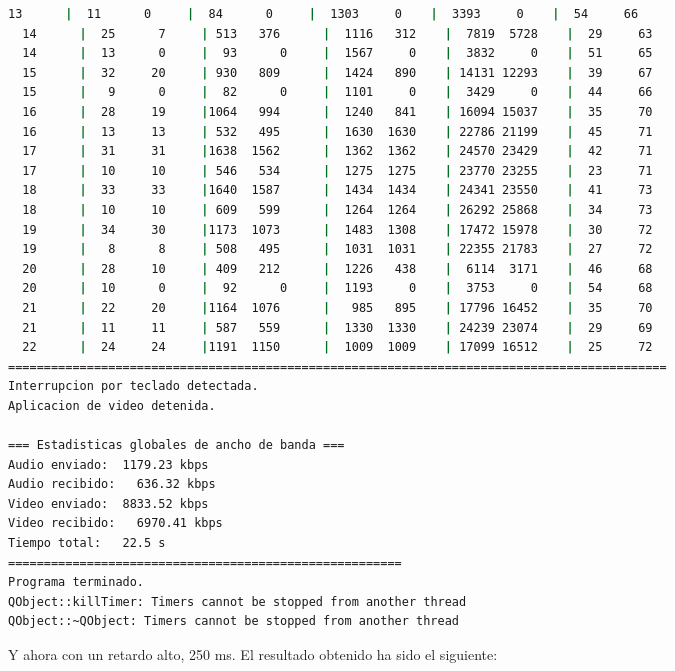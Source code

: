 \begin{adjustbox}{max width=\textwidth}
\begin{lstlisting}[language=bash,basicstyle=\ttfamily\scriptsize]
  13      |  11      0     |  84      0     |  1303     0    |  3393     0    |  54     66
  14      |  25      7     | 513   376      |  1116   312    |  7819  5728    |  29     63
  14      |  13      0     |  93      0     |  1567     0    |  3832     0    |  51     65
  15      |  32     20     | 930   809      |  1424   890    | 14131 12293    |  39     67
  15      |   9      0     |  82      0     |  1101     0    |  3429     0    |  44     66
  16      |  28     19     |1064   994      |  1240   841    | 16094 15037    |  35     70
  16      |  13     13     | 532   495      |  1630  1630    | 22786 21199    |  45     71
  17      |  31     31     |1638  1562      |  1362  1362    | 24570 23429    |  42     71
  17      |  10     10     | 546   534      |  1275  1275    | 23770 23255    |  23     71
  18      |  33     33     |1640  1587      |  1434  1434    | 24341 23550    |  41     73
  18      |  10     10     | 609   599      |  1264  1264    | 26292 25868    |  34     73
  19      |  34     30     |1173  1073      |  1483  1308    | 17472 15978    |  30     72
  19      |   8      8     | 508   495      |  1031  1031    | 22355 21783    |  27     72
  20      |  28     10     | 409   212      |  1226   438    |  6114  3171    |  46     68
  20      |  10      0     |  92      0     |  1193     0    |  3753     0    |  54     68
  21      |  22     20     |1164  1076      |   985   895    | 17796 16452    |  35     70
  21      |  11     11     | 587   559      |  1330  1330    | 24239 23074    |  29     69
  22      |  24     24     |1191  1150      |  1009  1009    | 17099 16512    |  25     72
============================================================================================
Interrupcion por teclado detectada.
Aplicacion de video detenida.

=== Estadisticas globales de ancho de banda ===
Audio enviado:	1179.23 kbps
Audio recibido:   636.32 kbps
Video enviado:	8833.52 kbps
Video recibido:   6970.41 kbps
Tiempo total: 	22.5 s
=======================================================
Programa terminado.
QObject::killTimer: Timers cannot be stopped from another thread
QObject::~QObject: Timers cannot be stopped from another thread
\end{lstlisting}
\end{adjustbox}
\vspace{\baselineskip}

\newpage

Y ahora con un retardo alto, 250 ms. El resultado obtenido ha sido el siguiente:
\vspace{\baselineskip}

